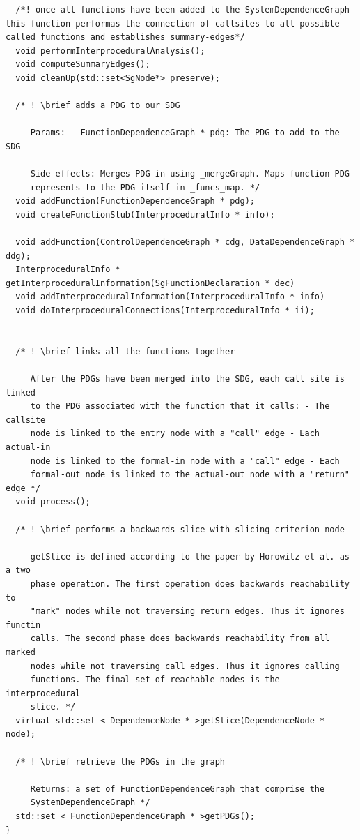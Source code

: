 \begin{enumerate}
\begin{enumerate}
\begin{lstlisting}
  /*! once all functions have been added to the SystemDependenceGraph this function performas the connection of callsites to all possible called functions and establishes summary-edges*/
  void performInterproceduralAnalysis();
  void computeSummaryEdges();
  void cleanUp(std::set<SgNode*> preserve);

  /* ! \brief adds a PDG to our SDG

     Params: - FunctionDependenceGraph * pdg: The PDG to add to the SDG

     Side effects: Merges PDG in using _mergeGraph. Maps function PDG
     represents to the PDG itself in _funcs_map. */
  void addFunction(FunctionDependenceGraph * pdg);
  void createFunctionStub(InterproceduralInfo * info);
    
  void addFunction(ControlDependenceGraph * cdg, DataDependenceGraph * ddg);
  InterproceduralInfo * getInterproceduralInformation(SgFunctionDeclaration * dec)
  void addInterproceduralInformation(InterproceduralInfo * info)
  void doInterproceduralConnections(InterproceduralInfo * ii);
    

  /* ! \brief links all the functions together

     After the PDGs have been merged into the SDG, each call site is linked
     to the PDG associated with the function that it calls: - The callsite
     node is linked to the entry node with a "call" edge - Each actual-in
     node is linked to the formal-in node with a "call" edge - Each
     formal-out node is linked to the actual-out node with a "return" edge */
  void process();

  /* ! \brief performs a backwards slice with slicing criterion node

     getSlice is defined according to the paper by Horowitz et al. as a two
     phase operation. The first operation does backwards reachability to
     "mark" nodes while not traversing return edges. Thus it ignores functin 
     calls. The second phase does backwards reachability from all marked
     nodes while not traversing call edges. Thus it ignores calling
     functions. The final set of reachable nodes is the interprocedural
     slice. */
  virtual std::set < DependenceNode * >getSlice(DependenceNode * node);

  /* ! \brief retrieve the PDGs in the graph

     Returns: a set of FunctionDependenceGraph that comprise the
     SystemDependenceGraph */
  std::set < FunctionDependenceGraph * >getPDGs();
}


\end{lstlisting}
\end{enumerate}
\end{enumerate}
